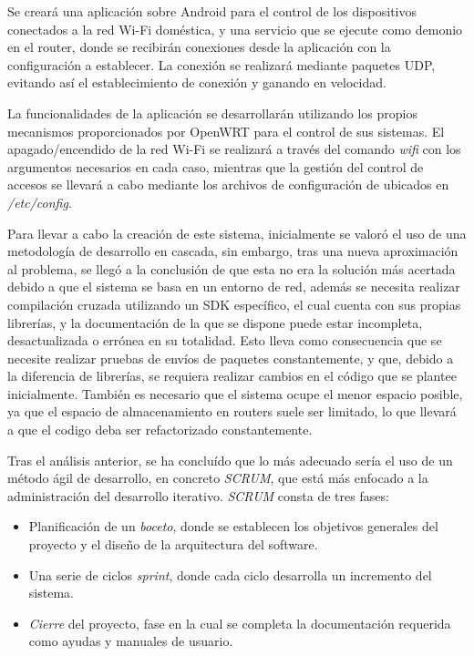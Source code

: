 \documentclass[12pt, twoside]{article}
\begin{document}
    Se creará una aplicación sobre Android para el control de los dispositivos conectados a la red Wi-Fi doméstica, y una servicio que se ejecute como demonio en el router, donde se recibirán conexiones desde la aplicación con la configuración a establecer. La conexión se realizará mediante paquetes UDP, evitando así el establecimiento de conexión y ganando en velocidad.

    La funcionalidades de la aplicación se desarrollarán utilizando los propios mecanismos proporcionados por OpenWRT para el control de sus sistemas. El apagado/encendido de la red Wi-Fi se realizará a través del comando \textit{wifi} con los argumentos necesarios en cada caso, mientras que la gestión del control de accesos se llevará a cabo mediante los archivos de configuración de ubicados en \textit{/etc/config}.

    Para llevar a cabo la creación de este sistema, inicialmente se valoró el uso de una metodología de desarrollo en cascada, sin embargo, tras una nueva aproximación al problema, se llegó a la conclusión de que esta no era la solución más acertada debido a que el sistema se basa en un entorno de red, además se necesita realizar compilación cruzada utilizando un SDK específico, el cual cuenta con sus propias librerías, y la documentación de la que se dispone puede estar incompleta, desactualizada o errónea en su totalidad. Esto lleva como consecuencia que se necesite realizar pruebas de envíos de paquetes constantemente, y que, debido a la diferencia de librerías, se requiera realizar cambios en el código que se plantee inicialmente. También es necesario que el sistema ocupe el menor espacio posible, ya que el espacio de almacenamiento en routers suele ser limitado, lo que llevará a que el codigo deba ser refactorizado constantemente.
    
    Tras el análisis anterior, se ha concluído que lo más adecuado sería el uso de un método ágil de desarrollo, en concreto \textit{SCRUM}, que está más enfocado a la administración del desarrollo iterativo. \textit{SCRUM} consta de tres fases:
    
    \begin{itemize}
        \item Planificación de un \textit{boceto}, donde se establecen los objetivos generales del proyecto y el diseño de la arquitectura del software.
        \item Una serie de ciclos \textit{sprint}, donde cada ciclo desarrolla un incremento del sistema.
        \item \textit{Cierre} del proyecto, fase en la cual se completa la documentación requerida como ayudas y manuales de usuario.
    \end{itemize}
\end{document}
